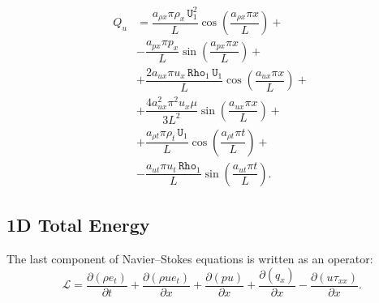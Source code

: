 \documentclass[10pt]{article}
\newcommand{\Diff}[2] {\dfrac{\partial( #1)}{\partial #2}}
\newcommand{\Rho}{\,\mathtt{Rho}}
\newcommand{\U}{\,\mathtt{U}}
\newcommand{\Lo}{\,\mathcal{L}}
\begin{document}
\begin{equation}
 \begin{split}
Q_u&=\dfrac{a_{\rho x} \pi \rho_x \U_1^2}{L}\cos\left(\dfrac{a_{\rho x} \pi x}{L}\right) +\\
&-\dfrac{ a_{px} \pi p_x}{L}\sin\left(\dfrac{a_{px} \pi x}{L}\right) +\\
&+  \dfrac{2a_{ux} \pi u_x \Rho_1 \U_1}{L}\cos\left(\dfrac{a_{ux} \pi x}{L}\right)+\\
&+\dfrac{4a_{ux}^2 \pi^2 u_x \mu }{3L^2}\sin\left(\dfrac{a_{ux} \pi x}{L}\right)+\\
&+ \dfrac{ a_{\rho t} \pi \rho_t \U_1}{L}\cos\left(\dfrac{a_{\rho t} \pi t}{L}\right)+\\
&-\dfrac{a_{ut} \pi u_t  \Rho_1 }{L}\sin\left(\dfrac{a_{ut} \pi t}{L}\right).
 \end{split}
\end{equation}



\subsection{1D Total Energy}


The last component of Navier--Stokes equations is written as an operator:
\begin{equation*}
 \Lo=\Diff{\rho e_t}{t} +\Diff{\rho ue_t}{x}+ \Diff{pu}{x}+ \Diff{q_x}{x}-\Diff{u\tau_{xx}}{x} .
\end{equation*}
\end{document}
